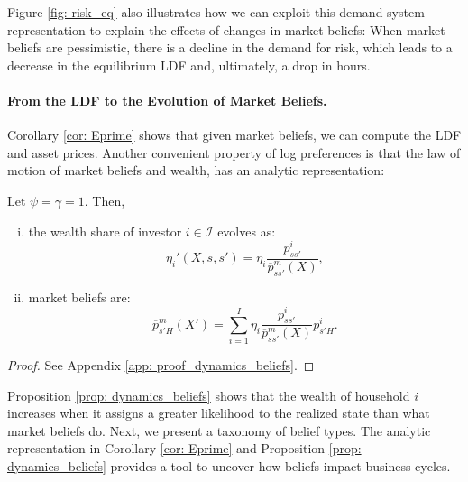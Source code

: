 Figure \ref{fig: risk_eq} also illustrates how we can exploit this demand system representation to explain the effects of changes in market beliefs: When market beliefs are pessimistic, there is a decline in the demand for risk, which leads to a decrease in the equilibrium LDF and, ultimately, a drop in hours. 


\paragraph{From the LDF to the Evolution of Market Beliefs.}

Corollary \ref{cor: Eprime} shows that given market beliefs, we can compute the LDF and asset prices. Another convenient property of log preferences is that the law of motion of market beliefs and wealth, has an analytic representation:
\begin{proposition}\label{prop: dynamics_beliefs} Let $\psi = \gamma = 1$. Then,
\begin{enumerate}[(i)]
    \item the wealth share of investor $i\in \mathcal{I}$ evolves as:
    \begin{equation}
    \eta_i'(X,s,s') = \eta_i \frac{p^i_{ss'}}{\overline{p}^m_{ss'}(X)},
\end{equation}

    \item market beliefs are:
    \begin{equation}
        \overline{p}^m_{s'H}(X') = \sum_{i=1}^I \eta_i \frac{p^i_{ss'}}{\overline{p}^m_{ss'}(X)} p_{s'H}^i.
    \end{equation}
\end{enumerate}
\end{proposition}
\begin{proof}
See Appendix \ref{app: proof_dynamics_beliefs}.
\end{proof}
Proposition \ref{prop: dynamics_beliefs} shows that the wealth of household $i$ increases when it assigns a greater likelihood to the realized state than what market beliefs do. Next, we present a taxonomy of belief types. The analytic representation in Corollary \ref{cor: Eprime} and Proposition \ref{prop: dynamics_beliefs} provides a tool to uncover how beliefs impact business cycles.


